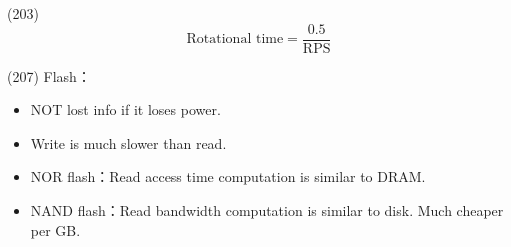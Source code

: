 \item \begin{theorem}{(203)} \begin{equation}
        \text{Rotational time} = \frac{0.5}{\text{RPS}}
    \end{equation} 
\end{theorem}

\item \begin{theorem}{(207)} Flash：\begin{itemize}
        \item NOT lost info if it loses power.
        \item Write is much slower than read.
        \item NOR flash：Read access time computation is similar to DRAM. 
        \item NAND flash：Read bandwidth computation is similar to disk. Much cheaper per GB.
    \end{itemize}
\end{theorem}

